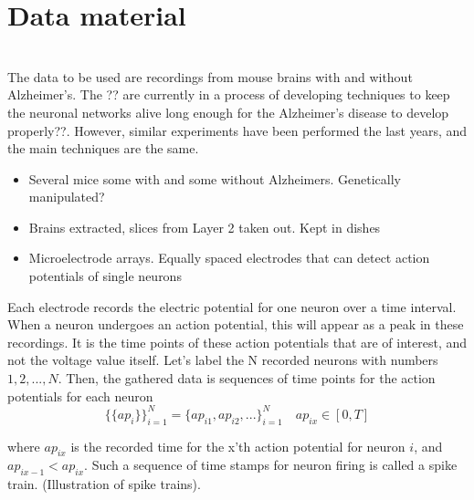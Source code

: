 
\section{Data material}

\label{Lab}\\
The data to be used are recordings from mouse brains with and without Alzheimer's. The ?? are currently in a process of developing techniques to keep the neuronal networks alive long enough for the Alzheimer's disease to develop properly??. However, similar experiments have been performed the last years, and the main techniques are the same. 
\begin{itemize}
    \item Several mice some with and some without Alzheimers. Genetically manipulated? 
    \item Brains extracted, slices from Layer 2 taken out. Kept in dishes
    \item Microelectrode arrays. Equally spaced electrodes that can detect action potentials of single neurons
    
\end{itemize}

Each electrode records the electric potential for one neuron over a time interval.  When a neuron undergoes an action potential, this will appear as a peak in these recordings. It is the time points of these action potentials that are of interest, and not the voltage value itself. Let's label the N recorded neurons with numbers $1,2,...,N$. Then, the gathered data is sequences of time points for the action potentials for each neuron
\begin{equation}
    \{\{ap_i\}\}_{i=1}^{N} = \{ap_{i1}, ap_{i2}, ...\}_{i=1}^{N} \quad ap_{ix} \in [0,T]
\end{equation}

where $ap_{ix}$ is the recorded time for the x'th action potential for neuron $i$, and $ap_{ix-1} < ap_{ix}$. Such a sequence of time stamps for neuron firing is called a spike train. (Illustration of spike trains).\\







\cleardoublepage